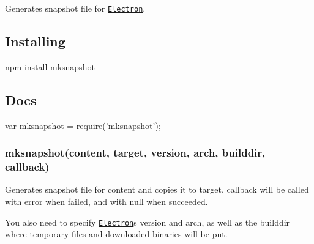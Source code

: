 Generates snapshot file for \href{https://github.com/atom/electron}{\tt Electron}.

\subsection*{Installing}


\begin{DoxyCode}
npm install mksnapshot
\end{DoxyCode}


\subsection*{Docs}


\begin{DoxyCode}
var mksnapshot = require('mksnapshot');
\end{DoxyCode}


\subsubsection*{mksnapshot(content, target, version, arch, builddir, callback)}

Generates snapshot file for {\ttfamily content} and copies it to {\ttfamily target}, {\ttfamily callback} will be called with {\ttfamily error} when failed, and with {\ttfamily null} when succeeded.

You also need to specify \href{https://github.com/atom/electron}{\tt Electron}\textquotesingle{}s {\ttfamily version} and {\ttfamily arch}, as well as the {\ttfamily builddir} where temporary files and downloaded binaries will be put. 